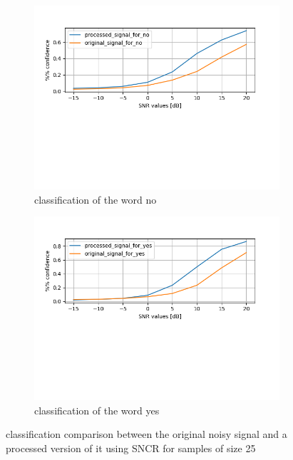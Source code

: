 \documentclass[11pt,a4paper,titlepage]{report}
\begin{document}
\begin{figure}[h!]
	\centering
	\begin{subfigure}{.5\textwidth}
		\centering
		\includegraphics[width=0.9\linewidth]{rapport_no_single_noise_channel_removal}
		\caption{classification of the word no}
		\label{fig:sub3}
	\end{subfigure}%
	\begin{subfigure}{.5\textwidth}
		\centering
		\includegraphics[width=0.9\linewidth]{rapport_yes_single_noise_channel_removal}
		\caption{classification of the word yes}
		\label{fig:sub5}
	\end{subfigure}

	\caption{classification comparison between the original noisy signal and a processed version of it using SNCR for samples of size 25}
	\label{fig:rapport12}
\end{figure}\\
\end{document}
